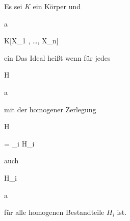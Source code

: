 {


Es sei $K$ ein Körper und


\mavergleichskette

{\vergleichskette

{ {\mathfrak a}
}

{ \subseteq }{ K[X_1 , \ldots ,  X_n]
}

{  }{
}

{    }{
}

{   }{
}

}
{}{}{}
ein
Das Ideal heißt  wenn für jedes


\mavergleichskette

{\vergleichskette

{H
}

{ \in }{ {\mathfrak a}
}

{  }{
}

{    }{
}

{   }{
}

}
{}{}{}
mit der homogener Zerlegung


\mavergleichskette

{\vergleichskette

{H
}

{ = }{ \sum_{i } H_i
}

{  }{
}

{    }{
}

{   }{
}

}
{}{}{}
auch


\mavergleichskette

{\vergleichskette

{H_i
}

{ \in }{ {\mathfrak a}
}

{  }{
}

{    }{
}

{   }{
}

}
{}{}{}
für alle homogenen Bestandteile $H_i$ ist.


}



{ }

